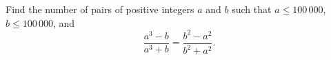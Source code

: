 Find the number of pairs of positive integers $a$ and $b$ such that  $a\leq 100\,000$, $b\leq 100\,000$, and
$$
\frac{a^3-b}{a^3+b}=\frac{b^2-a^2}{b^2+a^2}.
$$